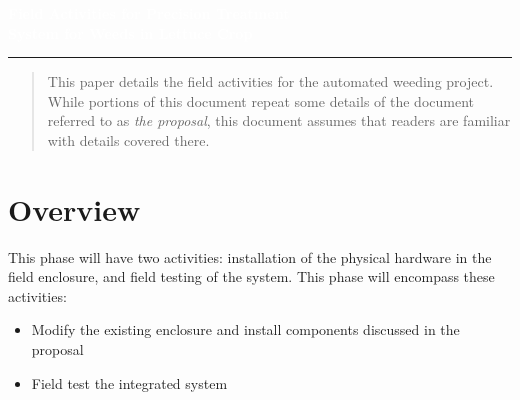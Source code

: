 \documentclass[12pt]{article}
\author{%
\setstretch{1.0}
    Evan McGinnis \\
    PhD Student \\
    Student ID\#  23633780\\
    Biosystems Analytics \\
    \today \\
    \texttt{evanmc@arizona.edu}\vspace{40pt} \\
    }
\makeatletter
\def\printauthor{%
    {\large \@author}}
\makeatother
\begin{document}
\begin{titlepage}
\BgThispage
{}
\vspace*{1cm}
\noindent
\textcolor{white}{\Huge\textbf{\textsf{Field Activities for Precision Treatment \\System for Weeds in Lettuce Crop}}}
\vspace*{2.5cm}\par
\noindent
\begin{minipage}{0.35\linewidth}
    \begin{flushright}
        \printauthor
    \end{flushright}
\end{minipage} \hspace{15pt}
%
\begin{minipage}{0.02\linewidth}
    \rule{1pt}{175pt}
\end{minipage} \hspace{-10pt}
%
\begin{minipage}{0.6\linewidth}
\vspace{5pt}
    \begin{abstract} 
This paper details the field activities for the automated weeding project. While portions of this document repeat some details of the document referred to as \textit{the proposal}, this document assumes that readers are familiar with details covered there.
    \end{abstract}
\end{minipage}
\end{titlepage}
\restoregeometry
%
%
{
\tableofcontents
\listoftables
\listoffigures
\newpage
}

{
\begin{versionhistory}
\end{versionhistory}
\newpage
}


\section{Overview}
This phase will have two activities: installation of the physical hardware in the field enclosure, and field testing of the system. This phase will encompass these activities:
\begin{itemize}
	\item{Modify the existing enclosure and install components discussed in the proposal}
	\item{Field test the integrated system}
\end{itemize}
\end{document}
